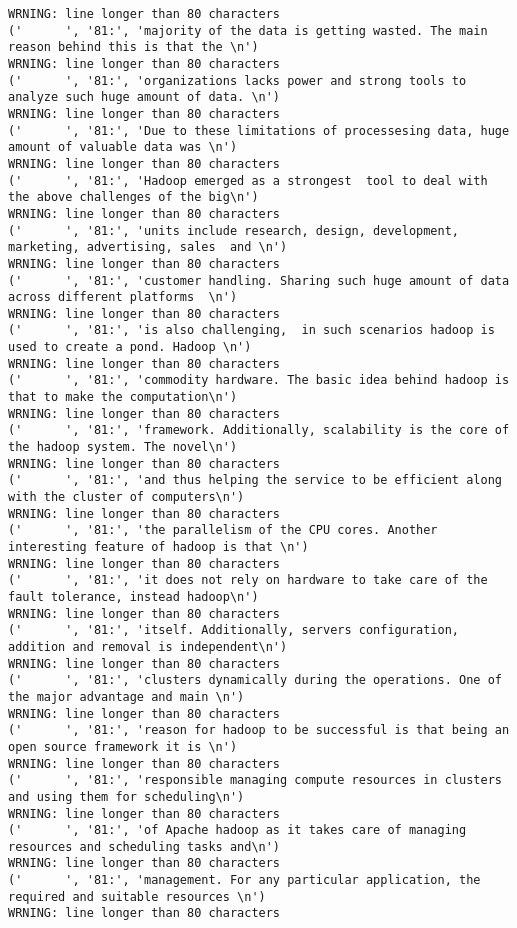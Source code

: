 \begin{tiny}
\begin{verbatim}
WRNING: line longer than 80 characters
('      ', '81:', 'majority of the data is getting wasted. The main reason behind this is that the \n')
WRNING: line longer than 80 characters
('      ', '81:', 'organizations lacks power and strong tools to analyze such huge amount of data. \n')
WRNING: line longer than 80 characters
('      ', '81:', 'Due to these limitations of processesing data, huge amount of valuable data was \n')
WRNING: line longer than 80 characters
('      ', '81:', 'Hadoop emerged as a strongest  tool to deal with the above challenges of the big\n')
WRNING: line longer than 80 characters
('      ', '81:', 'units include research, design, development, marketing, advertising, sales  and \n')
WRNING: line longer than 80 characters
('      ', '81:', 'customer handling. Sharing such huge amount of data across different platforms  \n')
WRNING: line longer than 80 characters
('      ', '81:', 'is also challenging,  in such scenarios hadoop is used to create a pond. Hadoop \n')
WRNING: line longer than 80 characters
('      ', '81:', 'commodity hardware. The basic idea behind hadoop is that to make the computation\n')
WRNING: line longer than 80 characters
('      ', '81:', 'framework. Additionally, scalability is the core of the hadoop system. The novel\n')
WRNING: line longer than 80 characters
('      ', '81:', 'and thus helping the service to be efficient along with the cluster of computers\n')
WRNING: line longer than 80 characters
('      ', '81:', 'the parallelism of the CPU cores. Another interesting feature of hadoop is that \n')
WRNING: line longer than 80 characters
('      ', '81:', 'it does not rely on hardware to take care of the fault tolerance, instead hadoop\n')
WRNING: line longer than 80 characters
('      ', '81:', 'itself. Additionally, servers configuration, addition and removal is independent\n')
WRNING: line longer than 80 characters
('      ', '81:', 'clusters dynamically during the operations. One of the major advantage and main \n')
WRNING: line longer than 80 characters
('      ', '81:', 'reason for hadoop to be successful is that being an open source framework it is \n')
WRNING: line longer than 80 characters
('      ', '81:', 'responsible managing compute resources in clusters and using them for scheduling\n')
WRNING: line longer than 80 characters
('      ', '81:', 'of Apache hadoop as it takes care of managing resources and scheduling tasks and\n')
WRNING: line longer than 80 characters
('      ', '81:', 'management. For any particular application, the required and suitable resources \n')
WRNING: line longer than 80 characters

\end{verbatim}
\end{tiny}
